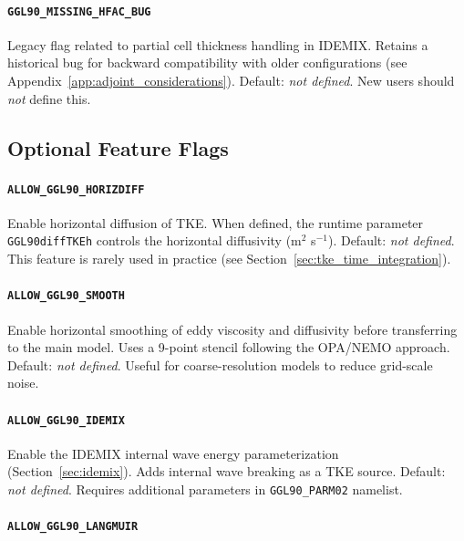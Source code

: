 \documentclass[12pt,letterpaper]{article}
\begin{document}
\paragraph{\texttt{GGL90\_MISSING\_HFAC\_BUG}}

Legacy flag related to partial cell thickness handling in IDEMIX. Retains a historical bug for backward compatibility with older configurations (see Appendix~\ref{app:adjoint_considerations}). Default: \emph{not defined}. New users should \emph{not} define this.

\subsection{Optional Feature Flags}
\label{sec:optional_cpp}

\paragraph{\texttt{ALLOW\_GGL90\_HORIZDIFF}}

Enable horizontal diffusion of TKE. When defined, the runtime parameter \verb|GGL90diffTKEh| controls the horizontal diffusivity (m$^2$ s$^{-1}$). Default: \emph{not defined}. This feature is rarely used in practice (see Section~\ref{sec:tke_time_integration}).

\paragraph{\texttt{ALLOW\_GGL90\_SMOOTH}}

Enable horizontal smoothing of eddy viscosity and diffusivity before transferring to the main model. Uses a 9-point stencil following the OPA/NEMO approach. Default: \emph{not defined}. Useful for coarse-resolution models to reduce grid-scale noise.

\paragraph{\texttt{ALLOW\_GGL90\_IDEMIX}}

Enable the IDEMIX internal wave energy parameterization (Section~\ref{sec:idemix}). Adds internal wave breaking as a TKE source. Default: \emph{not defined}. Requires additional parameters in \verb|GGL90_PARM02| namelist.

\paragraph{\texttt{ALLOW\_GGL90\_LANGMUIR}}
\end{document}
